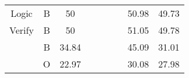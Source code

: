 \begin{tabular}{ccccccccc}
\rowcolor[HTML]{F3F3F3} 
Logic                                             & B                    & 50                   &            &             &            &            & 50.98       & 49.73      \\
Verify                                            & B                    & 50                   &            &             &            &            & 51.05       & 49.78      \\
\rowcolor[HTML]{F3F3F3} 
\cellcolor[HTML]{F3F3F3}                          & B                    & 34.84                &            &             &            &            & 45.09       & 31.01      \\
\rowcolor[HTML]{F3F3F3} 
\multirow{-2}{*}{\cellcolor[HTML]{F3F3F3}Overall} & O                    & 22.97                &            &             &            &            & 30.08       & 27.98     
\end{tabular}